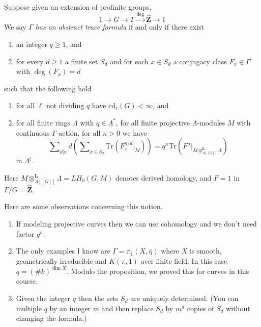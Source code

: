 \noindent
Suppose given an extension of profinite groups,
$$
1 \to G \to \Gamma \xrightarrow{\deg} \widehat{\mathbf{Z}} \to 1
$$
We say $\Gamma$ {\it has an abstract trace formula} if and only if
there exist
\begin{enumerate}
\item an integer $q\geq 1$, and
\item for every $d\geq 1$ a finite set $S_d$ and for each $x\in S_d$ a
conjugacy class $F_x \in \Gamma$ with $\deg(F_x) = d$
\end{enumerate}
such that the following hold
\begin{enumerate}
\item for all $\ell$ not dividing $q$ have $\text{cd}_\ell(G)<\infty$, and
\item for all finite rings $\Lambda$ with $q\in \Lambda^*$,
for all finite projective $\Lambda$-modules $M$ with continuous
$\Gamma$-action, for all $n>0$ we have
$$
\sum\nolimits_{d|n}d \left(
\sum\nolimits_{x \in S_d}
\text{Tr}( F_x^{n/d} |_M)
\right)
=
q^n \text{Tr}(F^n|_{M \otimes_{\Lambda[[G]]}^{\mathbf{L}}\Lambda})
$$
in $\Lambda^\natural$.
\end{enumerate}
Here $M \otimes_{\Lambda[[G]]}^{\mathbf{L}}\Lambda = LH_0(G, M)$ denotes
derived homology, and $F=1$ in $\Gamma/G = \widehat{\mathbf{Z}}$.

\begin{remark}
\label{remark-abstract-trace-formula}
Here are some observations concerning this notion.
\begin{enumerate}
\item If modeling projective curves then we can use cohomology and we
don't need factor $q^n$.
\item The only examples I know are $\Gamma = \pi_1(X, \overline \eta)$
where $X$ is smooth, geometrically irreducible and $K(\pi, 1)$ over finite
field. In this case $q = (\# k)^{\dim X}$. Modulo the proposition, we proved
this for curves in this course.
\item Given the integer $q$ then the sets $S_d$ are uniquely
determined. (You can multiple $q$ by an integer $m$ and then replace $S_d$ by
$m^d$ copies of $S_d$ without changing the formula.)
\end{enumerate}
\end{remark}

